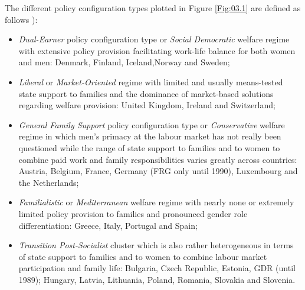 \documentclass[11 pt, a4paper]{report}
\begin{document}
\noindent The different policy configuration types plotted in Figure \ref{Fig:03.1} are defined as follows \citep{Olah2014}):\label{Txt:defs}
\begin{itemize}   
\item \emph{Dual-Earner} policy configuration type or \emph{Social Democratic }welfare regime with extensive policy provision facilitating work-life balance for both women and men: Denmark, Finland, Iceland,Norway and Sweden;
\item \emph{Liberal} or \emph{Market-Oriented} regime with limited and usually means-tested state support to families and the dominance of market-based solutions regarding welfare provision: United Kingdom, Ireland and Switzerland;
\item \emph{General Family Support} policy configuration type or \emph{Conservative} welfare regime in which men's primacy at the labour market has not really been questioned while the range of state support to families and to women to combine paid work and family responsibilities varies greatly across countries:  Austria, Belgium, France, Germany (FRG only until 1990), Luxembourg and the Netherlands;
\item \emph{Familialistic} or \emph{Mediterranean} welfare regime with nearly none or extremely limited policy provision to families and pronounced gender role differentiation:  Greece, Italy, Portugal and Spain;
\item    \emph{Transition Post-Socialist} cluster which is also rather heterogeneous in terms of state support to families and to women to combine labour market participation and family life: Bulgaria, Czech Republic, Estonia, GDR (until 1989); Hungary, Latvia, Lithuania, Poland, Romania, Slovakia and Slovenia.
\end{itemize}
\end{document}
